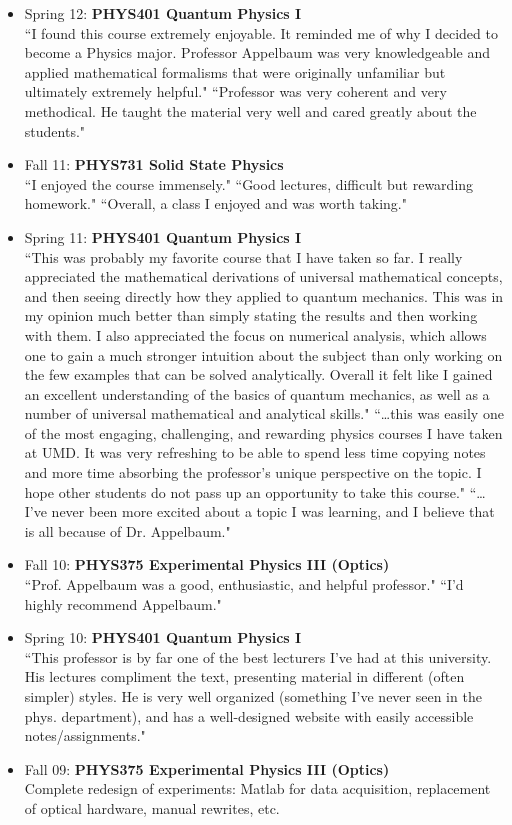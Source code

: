 \documentclass[paper=letter,fontsize=11pt]{scrartcl} %
\newcommand{\CourseEntry}[3]{
		\noindent \item{#1: \textbf{#2} \\ #3}}
\begin{document}
\begin{itemize}
\CourseEntry{Spring 12}{PHYS401 Quantum Physics I}
{``I found this course extremely enjoyable. It reminded me of why I decided to become a Physics major. Professor Appelbaum was very knowledgeable and applied mathematical formalisms that were originally unfamiliar but ultimately extremely helpful."  ``Professor was very coherent and very methodical. He taught the material very well and cared greatly about the students."} 

\CourseEntry{Fall 11}{PHYS731 Solid State Physics}
{``I enjoyed the course immensely." ``Good lectures, difficult but rewarding homework." ``Overall, a class I enjoyed and was worth taking." \textattachfile[color=1 0 1]{letterfromDrew020312.jpg}{Chair’s commendation.}}

\CourseEntry{Spring 11}{PHYS401 Quantum Physics I}
{``This was probably my favorite course that I have taken so far. I really appreciated the mathematical derivations of universal mathematical concepts, and then seeing directly how they applied to quantum mechanics. This was in my opinion much better than simply stating the results and then working with them. I also appreciated the focus on numerical analysis, which allows one to gain a much stronger intuition about the subject than only working on the few examples that can be solved analytically. Overall it felt like I gained an excellent understanding of the basics of quantum mechanics, as well as a number of universal mathematical and analytical skills." ``\ldots this was easily one of the most engaging, challenging, and rewarding physics courses I have taken at UMD. It was very refreshing to be able to spend less time copying notes and more time absorbing the professor's unique perspective on the topic. I hope other students do not pass up an opportunity to take this course." ``\ldots I've never been more excited about a topic I was learning, and I believe that is all because of Dr. Appelbaum."}

\CourseEntry{Fall 10}{PHYS375 Experimental Physics III (Optics)}
{``Prof. Appelbaum was a good, enthusiastic, and helpful professor." ``I'd highly recommend Appelbaum."}

\CourseEntry{Spring 10}{PHYS401 Quantum Physics I}
{``This professor is by far one of the best lecturers I've had at this university. His lectures compliment the text, presenting material in different (often simpler) styles. He is very well organized (something I’ve never seen in the phys. department), and has a well-designed website with easily accessible notes/assignments."}

\CourseEntry{Fall 09}{PHYS375 Experimental Physics III (Optics)}
{Complete redesign of experiments: Matlab for data acquisition, replacement of optical hardware, manual rewrites, etc.}
\end{itemize}
\end{document}
